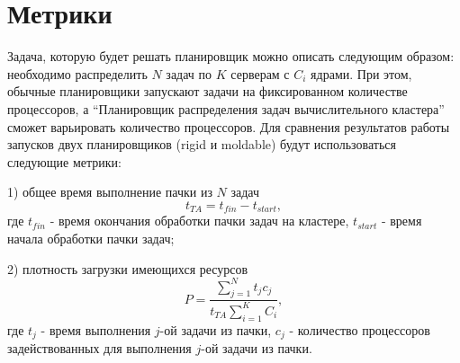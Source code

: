 \documentclass{article}
\begin{document}
\section{Метрики}
Задача, которую будет решать планировщик можно описать следующим образом: необходимо распределить $N$ задач по $K$ серверам с $C_i$ ядрами. При этом, обычные планировщики запускают задачи на фиксированном количестве процессоров, а “Планировщик распределения задач вычислительного кластера” сможет варьировать количество процессоров. 
Для сравнения результатов работы запусков двух планировщиков (rigid и moldable) будут использоваться следующие метрики: 

1) общее время выполнение пачки из $N$ задач $$t_{TA}=t_{fin}-t_{start},$$ где $t_{fin}$ - время окончания обработки пачки задач на кластере, $t_{start}$ - время начала обработки пачки задач; 

2) плотность загрузки имеющихся ресурсов $$P =\frac{
\sum_{j=1}^{N} 
t_j c_j}
{t_{TA} 
\sum_{i=1}^{K} 
C_i
},$$ где $t_j$ - время выполнения $j$-ой задачи из пачки,  $c_j$ - количество процессоров задействованных для выполнения $j$-ой задачи из пачки. 
\end{document}
